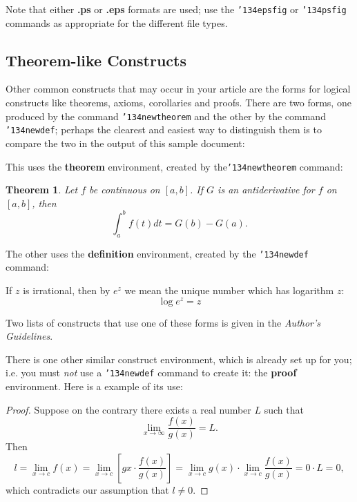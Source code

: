 \documentclass{sig-alternate}
\begin{document}
	Note that either {\textbf{.ps}} or {\textbf{.eps}} formats are
	used; use
	the \texttt{{\char'134}epsfig} or \texttt{{\char'134}psfig}
	commands as appropriate for the different file types.
	
	
	\subsection{Theorem-like Constructs}
	Other common constructs that may occur in your article are
	the forms for logical constructs like theorems, axioms,
	corollaries and proofs.  There are
	two forms, one produced by the
	command \texttt{{\char'134}newtheorem} and the
	other by the command \texttt{{\char'134}newdef}; perhaps
	the clearest and easiest way to distinguish them is
	to compare the two in the output of this sample document:
	
	This uses the \textbf{theorem} environment, created by
	the\linebreak\texttt{{\char'134}newtheorem} command:
	\newtheorem{theorem}{Theorem}
	\begin{theorem}
		Let $f$ be continuous on $[a,b]$.  If $G$ is
		an antiderivative for $f$ on $[a,b]$, then
		\begin{displaymath}\int^b_af(t)dt = G(b) - G(a).\end{displaymath}
	\end{theorem}
	
	The other uses the \textbf{definition} environment, created
	by the \texttt{{\char'134}newdef} command:
	\begin{definition}
		If $z$ is irrational, then by $e^z$ we mean the
		unique number which has
		logarithm $z$: \begin{displaymath}{\log e^z = z}\end{displaymath}
	\end{definition}
	
	Two lists of constructs that use one of these
	forms is given in the
	\textit{Author's  Guidelines}.
	
	There is one other similar construct environment, which is
	already set up
	for you; i.e. you must \textit{not} use
	a \texttt{{\char'134}newdef} command to
	create it: the \textbf{proof} environment.  Here
	is a example of its use:
	\begin{proof}
		Suppose on the contrary there exists a real number $L$ such that
		\begin{displaymath}
		\lim_{x\rightarrow\infty} \frac{f(x)}{g(x)} = L.
		\end{displaymath}
		Then
		\begin{displaymath}
		l=\lim_{x\rightarrow c} f(x)
		= \lim_{x\rightarrow c}
		\left[ g{x} \cdot \frac{f(x)}{g(x)} \right ]
		= \lim_{x\rightarrow c} g(x) \cdot \lim_{x\rightarrow c}
		\frac{f(x)}{g(x)} = 0\cdot L = 0,
		\end{displaymath}
		which contradicts our assumption that $l\neq 0$.
	\end{proof}
	
\end{document}
